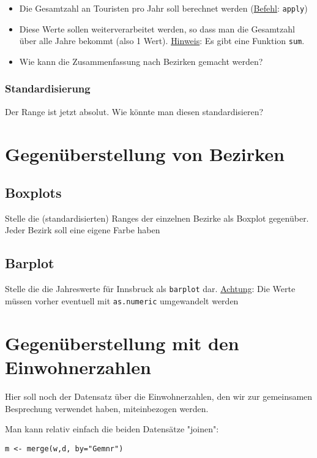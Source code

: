 \documentclass{article}
\begin{document}
\begin{itemize}
	\item Die Gesamtzahl an Touristen pro Jahr soll berechnet werden (\underline{Befehl}: \texttt{apply})
	\item Diese Werte sollen weiterverarbeitet werden, so dass man die Gesamtzahl über alle Jahre bekommt (also 1 Wert). \underline{Hinweis}: Es gibt eine Funktion \texttt{sum}.
	\item Wie kann die Zusammenfassung nach Bezirken gemacht werden?
\end{itemize}

\subsubsection{Standardisierung}

Der Range ist jetzt absolut. Wie könnte man diesen standardisieren?


\section{Gegenüberstellung von Bezirken}


\subsection{Boxplots}

Stelle die (standardisierten) Ranges der einzelnen Bezirke als Boxplot gegenüber. Jeder Bezirk soll eine eigene Farbe haben 

\subsection{Barplot}

Stelle die  die Jahreswerte für Innsbruck als \texttt{barplot} dar. \underline{Achtung}: Die Werte müssen vorher eventuell mit \texttt{as.numeric} umgewandelt werden

\section{Gegenüberstellung mit den Einwohnerzahlen}

Hier soll noch der Datensatz über die Einwohnerzahlen, den wir zur gemeinsamen Besprechung verwendet haben, miteinbezogen werden.

Man kann relativ einfach die beiden Datensätze "joinen":

\begin{lstlisting}
m <- merge(w,d, by="Gemnr")
\end{lstlisting}
\end{document}
